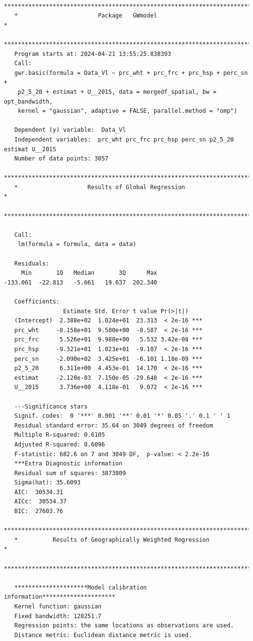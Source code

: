 \documentclass[
]{article}
\begin{document}
\begin{verbatim}
   ***********************************************************************
   *                       Package   GWmodel                             *
   ***********************************************************************
   Program starts at: 2024-04-21 13:55:25.838393 
   Call:
   gwr.basic(formula = Data_Vl ~ prc_wht + prc_frc + prc_hsp + perc_sn + 
    p2_5_20 + estimat + U__2015, data = mergedf_spatial, bw = opt_bandwidth, 
    kernel = "gaussian", adaptive = FALSE, parallel.method = "omp")

   Dependent (y) variable:  Data_Vl
   Independent variables:  prc_wht prc_frc prc_hsp perc_sn p2_5_20 estimat U__2015
   Number of data points: 3057
   ***********************************************************************
   *                    Results of Global Regression                     *
   ***********************************************************************

   Call:
    lm(formula = formula, data = data)

   Residuals:
     Min       1Q   Median       3Q      Max 
-133.061  -22.813   -5.661   19.637  202.340 

   Coefficients:
                 Estimate Std. Error t value Pr(>|t|)    
   (Intercept)  2.388e+02  1.024e+01  23.313  < 2e-16 ***
   prc_wht     -8.158e+01  9.500e+00  -8.587  < 2e-16 ***
   prc_frc      5.526e+01  9.988e+00   5.532 3.42e-08 ***
   prc_hsp     -9.321e+01  1.023e+01  -9.107  < 2e-16 ***
   perc_sn     -2.090e+02  3.425e+01  -6.101 1.18e-09 ***
   p2_5_20      6.311e+00  4.453e-01  14.170  < 2e-16 ***
   estimat     -2.120e-03  7.150e-05 -29.648  < 2e-16 ***
   U__2015      3.736e+00  4.118e-01   9.072  < 2e-16 ***

   ---Significance stars
   Signif. codes:  0 '***' 0.001 '**' 0.01 '*' 0.05 '.' 0.1 ' ' 1 
   Residual standard error: 35.64 on 3049 degrees of freedom
   Multiple R-squared: 0.6105
   Adjusted R-squared: 0.6096 
   F-statistic: 682.6 on 7 and 3049 DF,  p-value: < 2.2e-16 
   ***Extra Diagnostic information
   Residual sum of squares: 3873809
   Sigma(hat): 35.6093
   AIC:  30534.31
   AICc:  30534.37
   BIC:  27603.76
   ***********************************************************************
   *          Results of Geographically Weighted Regression              *
   ***********************************************************************

   *********************Model calibration information*********************
   Kernel function: gaussian 
   Fixed bandwidth: 128251.7 
   Regression points: the same locations as observations are used.
   Distance metric: Euclidean distance metric is used.


\end{verbatim}
\end{document}
